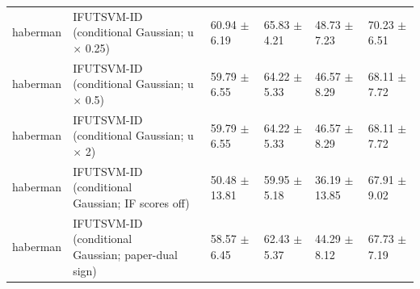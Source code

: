 \begin{table}[!t]
{\begin{tabular}{llllll}
haberman & \shortstack[l]{IFUTSVM-ID (conditional\\Gaussian; u \(\times\) 0.25)} & 60.94 \(\pm\) 6.19 & 65.83 \(\pm\) 4.21 & 48.73 \(\pm\) 7.23 & 70.23 \(\pm\) 6.51 \\
haberman & \shortstack[l]{IFUTSVM-ID (conditional\\Gaussian; u \(\times\) 0.5)} & 59.79 \(\pm\) 6.55 & 64.22 \(\pm\) 5.33 & 46.57 \(\pm\) 8.29 & 68.11 \(\pm\) 7.72 \\
haberman & \shortstack[l]{IFUTSVM-ID (conditional\\Gaussian; u \(\times\) 2)} & 59.79 \(\pm\) 6.55 & 64.22 \(\pm\) 5.33 & 46.57 \(\pm\) 8.29 & 68.11 \(\pm\) 7.72 \\
haberman & \shortstack[l]{IFUTSVM-ID (conditional\\Gaussian; IF scores off)} & 50.48 \(\pm\) 13.81 & 59.95 \(\pm\) 5.18 & 36.19 \(\pm\) 13.85 & 67.91 \(\pm\) 9.02 \\
haberman & \shortstack[l]{IFUTSVM-ID (conditional\\Gaussian; paper-dual\\sign)} & 58.57 \(\pm\) 6.45 & 62.43 \(\pm\) 5.37 & 44.29 \(\pm\) 8.12 & 67.73 \(\pm\) 7.19 \\
\hline
\end{tabular}%
}
\end{table}

